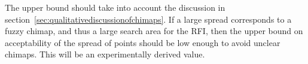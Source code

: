 \documentclass[a4paper,12pt]{article}
\begin{document}
                                                                                                                                                                                                                                                                                                                                                                                                                                                                                                                                                                                                                                                                                                                                                                                                                                                                                                                                                                                                                                                                                                                                                                                                                                                                                                                                                                                                                                                                                                                                                                                                                                                                                                                                                                                                                                                                                                                                                                                                                                                                                                             The upper bound should take into account the discussion in section~\ref{sec:qualitativediscussionofchimaps}. If a large spread corresponds to a fuzzy chimap, and thus a large search area for the RFI, then the upper bound on acceptability of the spread of points should be low enough to avoid unclear chimaps. This will be an experimentally derived value.
\end{document}
